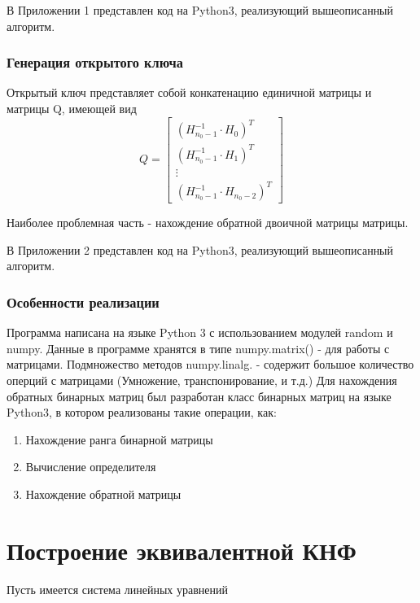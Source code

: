 \documentclass[12pt]{article}
\begin{document}
В Приложении 1 представлен код на Python3, реализующий вышеописанный алгоритм.

\subsubsection{Генерация открытого ключа}

Открытый ключ представляет собой конкатенацию единичной матрицы и матрицы Q, имеющей вид 
\[ 
Q = \begin{bmatrix}  (H^{-1}_{n_{0}-1}\cdot H_{0})^{T}\\(H^{-1}_{n_{0}-1}\cdot H_{1})^{T}\\ \vdots \\ (H^{-1}_{n_{0}-1}\cdot H_{n_{0}-2})^{T} \end{bmatrix}
\]

Наиболее проблемная часть - нахождение обратной двоичной матрицы матрицы.

В Приложении 2 представлен код на Python3, реализующий вышеописанный алгоритм.

\newpage

\subsubsection{Особенности реализации}

Программа написана на языке Python 3 с использованием модулей random и numpy. Данные в программе хранятся в типе numpy.matrix() - для работы с матрицами. Подмножество методов numpy.linalg. - содержит большое количество оперций с матрицами (Умножение, транспонирование, и т.д.)
Для нахождения обратных бинарных матриц был разработан класс бинарных матриц на языке Python3, в котором реализованы такие операции, как:

\begin{enumerate}

\item Нахождение ранга бинарной матрицы
\item Вычисление определителя 
\item Нахождение обратной матрицы

\end{enumerate}

\newpage

\section{Построение эквивалентной КНФ}

Пусть имеется система линейных уравнений
\end{document}
